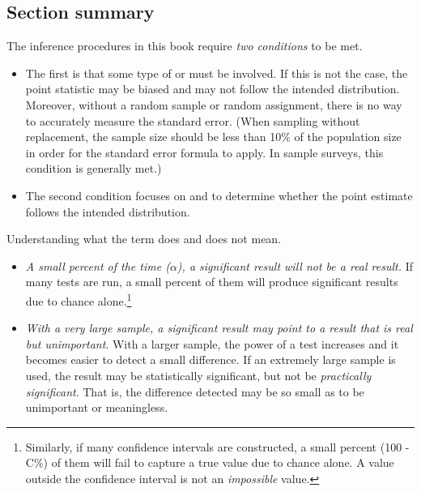 \D{\newpage}

\subsection*{Section summary}
\noindent The inference procedures in this book require \emph{two conditions} to be met.
\begin{itemize}
\item The first is that some type of  or  must be involved.  If this is not the case, the point statistic may be biased and may not follow the intended distribution.  Moreover, without a random sample or random assignment, there is no way to accurately measure the standard error.  (When sampling without replacement, the sample size should be less than 10\% of the population size in order for the standard error formula to apply.  In sample surveys, this condition is generally met.)
\item The second condition focuses on  and  to determine whether the point estimate follows the intended distribution.  
\end{itemize}
Understanding what the term  does and does not mean.
\begin{itemize}
\item \emph{A small percent of the time ($\alpha$), a significant result will not be a real result.} If many tests are run, a small percent of them will produce significant results due to chance alone.\footnote{Similarly, if many confidence intervals are constructed, a small percent (100 - C\%) of them will fail to capture a true value due to chance alone.  A value outside the confidence interval is not an \emph{impossible} value.}

\item \emph{With a very large sample, a significant result may point to a result that is real but unimportant}. With a larger sample, the power of a test increases and it becomes easier to detect a small difference.  If an extremely large sample is used, the result may be statistically significant, but not be \emph{practically significant}.  That is, the difference detected may be so small as to be unimportant or meaningless.  
\end{itemize}


\newpage
\reviewchapterheader{}

